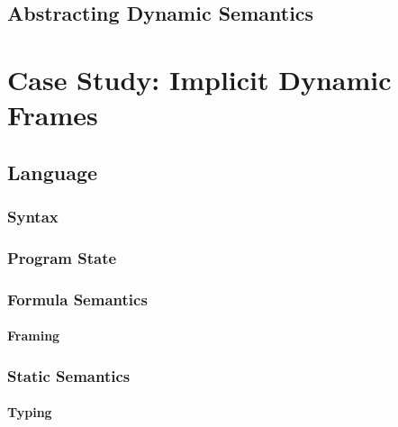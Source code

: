 \section{Abstracting Dynamic Semantics}
\label{sec:abstracting-dynamic-semantics}






\chapter{Case Study: Implicit Dynamic Frames}
\label{ch:case-study--implicit}


\section{Language}
\label{sec:language}


    \subsection{Syntax}
    \label{sec:syntax}
    
    
    \subsection{Program State}
    \label{ssec:program-state}
    
        
    \subsection{Formula Semantics}
    \label{ssec:formula-semantics}
    
    
        \subsubsection{Framing}
        \label{sssec:framing}
        
    
    \subsection{Static Semantics}
    \label{sec:static-semantics}
    
        
        \subsubsection{Typing}
        \label{sssec:typing}
        
    

